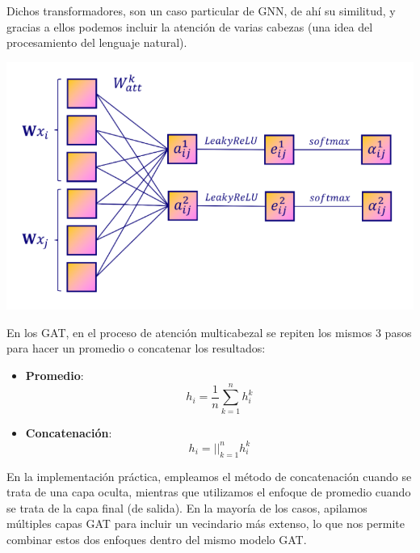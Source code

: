 \documentclass{article}
\begin{document}
\vspace{0.5cm}

Dichos transformadores, son un caso particular de GNN, de ahí su similitud, y gracias a ellos podemos incluir la atención de varias cabezas (una idea del procesamiento del lenguaje natural).

\vspace{0.5cm}

\begin{center}
    \includegraphics[width=0.75\linewidth]{transformadores.png}
\end{center}

\vspace{0.5cm}

En los GAT, en el proceso de atención multicabezal se repiten los mismos 3 pasos para hacer un promedio o concatenar los resultados:

\vspace{0.5cm}

\begin{itemize}
    \item \textbf{Promedio}: 
        \begin{equation}
            h_{i} = \frac{1}{n} \sum_{k=1}^{n} h_{i}^{k}
        \end{equation}
    \item \textbf{Concatenación}:
        \begin{equation}
             h_{i} = ||_{k=1}^{n}h_{i}^{k}
        \end{equation}
\end{itemize}

\vspace{0.5cm}

En la implementación práctica, empleamos el método de concatenación cuando se trata de una capa oculta, mientras que utilizamos el enfoque de promedio cuando se trata de la capa final (de salida). En la mayoría de los casos, apilamos múltiples capas GAT para incluir un vecindario más extenso, lo que nos permite combinar estos dos enfoques dentro del mismo modelo GAT.
\end{document}
